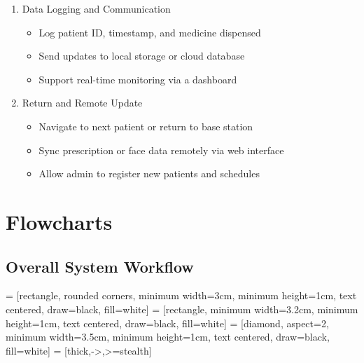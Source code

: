 \begin{enumerate}
    \item Data Logging and Communication
    \begin{itemize}
        \item Log patient ID, timestamp, and medicine dispensed
        \item Send updates to local storage or cloud database
        \item Support real-time monitoring via a dashboard
    \end{itemize}

    \item Return and Remote Update
    \begin{itemize}
        \item Navigate to next patient or return to base station
        \item Sync prescription or face data remotely via web interface
        \item Allow admin to register new patients and schedules
    \end{itemize}
\end{enumerate}

\vspace{1.5\baselineskip}
\newpage

\section{Flowcharts}

\subsection{Overall System Workflow}



 = [rectangle, rounded corners, minimum width=3cm, minimum height=1cm, text centered, draw=black, fill=white]
 = [rectangle, minimum width=3.2cm, minimum height=1cm, text centered, draw=black, fill=white]
 = [diamond, aspect=2, minimum width=3.5cm, minimum height=1cm, text centered, draw=black, fill=white]
 = [thick,->,>=stealth]




